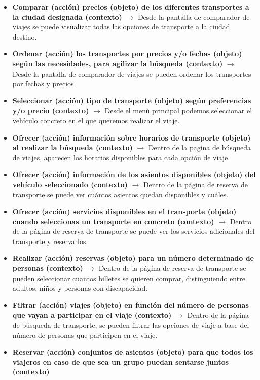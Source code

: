 \begin{itemize}
    \item \textbf{Comparar (acción) precios (objeto) de los diferentes transportes a la ciudad designada (contexto)} $\rightarrow$ Desde la pantalla de comparador 
    de viajes se puede visualizar todas las opciones de transporte a la ciudad destino.
    \item \textbf{Ordenar (acción) los transportes por precios y/o fechas (objeto) según las necesidades, para agilizar la búsqueda (contexto)} $\rightarrow$ Desde 
    la pantalla de comparador de viajes se pueden ordenar los transportes por fechas y precios.
    \item \textbf{Seleccionar (acción) tipo de transporte (objeto) según preferencias y/o precio (contexto)} $\rightarrow$ Desde el menú principal podemos seleccionar 
    el vehículo concreto en el que queremos realizar el viaje.
    \item \textbf{Ofrecer (acción) información sobre horarios de transporte (objeto) al realizar la búsqueda (contexto)} $\rightarrow$ Dentro de la pagina de búsqueda 
    de viajes, aparecen los horarios disponibles para cada opción de viaje.
    \item \textbf{Ofrecer (acción) información de los asientos disponibles (objeto) del vehículo seleccionado (contexto)} $\rightarrow$ Dentro de la página de reserva 
    de transporte se puede ver cuántos asientos quedan disponibles y cuáles.
    \item \textbf{Ofrecer (acción) servicios disponibles en el transporte (objeto) cuando seleccionas un transporte en concreto (contexto)} $\rightarrow$ Dentro de la 
    página de reserva de transporte se puede ver los servicios adicionales del transporte y reservarlos.
    \item \textbf{Realizar (acción) reservas (objeto) para un número determinado de personas (contexto)} $\rightarrow$ Dentro de la página de reserva de transporte 
    se pueden seleccionar cuantos billetes se quieren comprar, distinguiendo entre adultos, niños y personas con discapacidad.
    \item \textbf{Filtrar (acción) viajes (objeto) en función del número de personas que vayan a participar en el viaje (contexto)} $\rightarrow$ Dentro de la página 
    de búsqueda de transporte, se pueden filtrar las opciones de viaje a base del número de personas que participen en el viaje.
    \item \textbf{Reservar (acción) conjuntos de asientos (objeto) para que todos los viajeros en caso de que sea un grupo puedan sentarse juntos (contexto)} 

\end{itemize}
